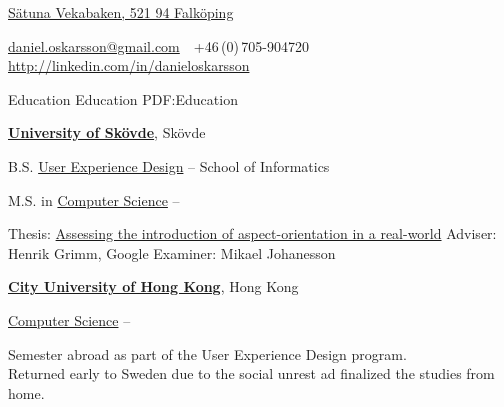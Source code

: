 \documentclass[letterpaper,MMMyyyy,nonstopmode]{simpleresumecv}
\newcommand{\CVAuthor}{Daniel Oskarsson}
\newcommand{\CVWebpage}{http://linkedin.com/in/danieloskarsson}
\begin{document}

\Title{\CVAuthor}

\begin{SubTitle}
\href{https://www.google.com/maps/place/VEKABACKEN,+521+94+Falk%C3%B6ping/@58.3358392,13.7009896,12z/data=!4m5!3m4!1s0x465ae469d63424bf:0xb367c493ed2f945c!8m2!3d58.2692871!4d13.5626312}
{Sätuna Vekabaken, 521 94 Falköping}
\par
\href{mailto:daniel.oskarsson@gmail.com}
{daniel.oskarsson@gmail.com}
\,\SubBulletSymbol\,
+46\,(0)\,705-904720
\\
\href{\CVWebpage}
{\url{\CVWebpage}}
\end{SubTitle}

\begin{Body}


\Section
{Education}
{Education}
{PDF:Education}

\Entry
\href{http://www.example.com/my-university}
{\textbf{University of Skövde}},
Skövde

\Gap
\BulletItem
B.S.
\href{http://www.his.se/uxd}
{User Experience Design}
\hfill
{} --
\newline
School of Informatics



\Gap
\BulletItem
M.S. in
\href{http://his.se/dvp}
{Computer Science}
\hfill
{} --
\begin{Detail}
\SubBulletItem
Thesis:
\href{http://urn.kb.se/resolve?urn=urn:nbn:se:his:diva-13461}
{Assessing the introduction of aspect-orientation in a real-world}
\SubBulletItem
Adviser:
Henrik Grimm, Google
\SubBulletItem
Examiner:
Mikael Johanesson
\end{Detail}
    
\BigGap
\Entry
\href{http://cityu.edu.hk}
{\textbf{City University of Hong Kong}}, Hong Kong

\Gap
\BulletItem
\href{https://cs.cityu.edu.hk/courses/exchange.html}
{Computer Science}
\hfill
{} --
\begin{Detail}
\SubBulletItem
Semester abroad as part of the User Experience Design program.\\Returned early to Sweden due to the social unrest ad finalized the studies from home.
\end{Detail}


\end{Body}
\end{document}
